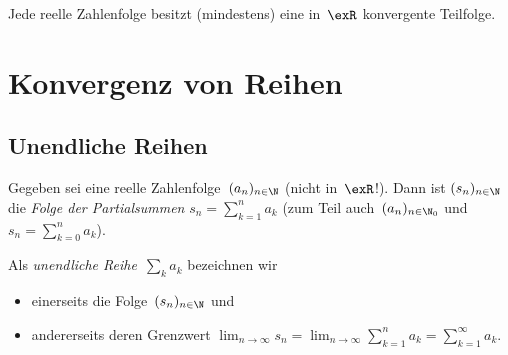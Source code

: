 \documentclass[a4paper]{article}
\begin{document}
\begin{corollary}
    Jede reelle Zahlenfolge besitzt (mindestens) eine in~$\exR$ konvergente Teilfolge.
\end{corollary}

\section{Konvergenz von Reihen}

\subsection{Unendliche Reihen}

\begin{definition}
    Gegeben sei eine reelle Zahlenfolge~$(a_n)_{n\in\N}$ (nicht in~$\exR$!). Dann ist $(s_n)_{n\in\N}$ die \emph{Folge der Partialsummen} $s_n = \sum_{k=1}^n a_k$ (zum Teil auch~$(a_n)_{n\in\N_0}$ und $s_n = \sum_{k=0}^n a_k$).

    Als \emph{unendliche Reihe}~$\sum_k a_k$ bezeichnen wir
    \begin{itemize}
        \item einerseits die Folge~$(s_n)_{n\in\N}$ und
        \item andererseits deren Grenzwert $\lim_{n\to\infty} s_n = \lim_{n\to\infty} \sum_{k=1}^n a_k = \sum_{k=1}^\infty a_k$.
    \end{itemize}
\end{definition}
\end{document}
